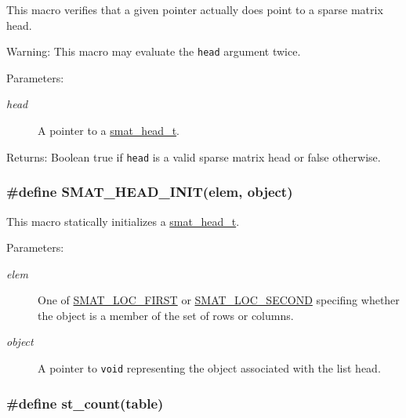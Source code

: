 This macro verifies that a given pointer actually does point to a sparse matrix head.

\begin{Desc}
\item[Warning:]This macro may evaluate the {\tt head} argument twice.\end{Desc}
\begin{Desc}
\item[Parameters:]
\begin{description}
\item[{\em head}]A pointer to a \hyperlink{group__dbprim__smat_a1}{smat\_\-head\_\-t}.\end{description}
\end{Desc}
\begin{Desc}
\item[Returns:]Boolean true if {\tt head} is a valid sparse matrix head or false otherwise. \end{Desc}
\hypertarget{group__dbprim__smat_a28}{
\subsubsection[SMAT\_\-HEAD\_\-INIT]{\setlength{\rightskip}{0pt plus 5cm}\#define SMAT\_\-HEAD\_\-INIT(elem, object)}}
\label{group__dbprim__smat_a28}


This macro statically initializes a \hyperlink{group__dbprim__smat_a1}{smat\_\-head\_\-t}.

\begin{Desc}
\item[Parameters:]
\begin{description}
\item[{\em elem}]One of \hyperlink{group__dbprim__smat_a47a135}{SMAT\_\-LOC\_\-FIRST} or \hyperlink{group__dbprim__smat_a47a136}{SMAT\_\-LOC\_\-SECOND} specifing whether the object is a member of the set of rows or columns. \item[{\em object}]A pointer to {\tt void} representing the object associated with the list head. \end{description}
\end{Desc}
\hypertarget{group__dbprim__smat_a25}{
\subsubsection[st\_\-count]{\setlength{\rightskip}{0pt plus 5cm}\#define st\_\-count(table)}}
\label{group__dbprim__smat_a25}


